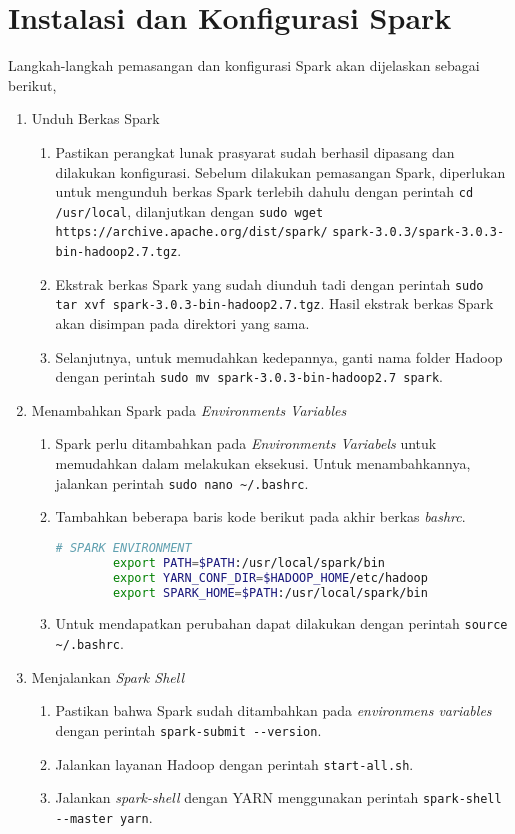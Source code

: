 \chapter{Instalasi dan Konfigurasi Spark}
\label{appendix:D}

Langkah-langkah pemasangan dan konfigurasi Spark akan dijelaskan sebagai berikut,

\begin{enumerate}
  \item Unduh Berkas Spark
  \begin{enumerate}
    \item Pastikan perangkat lunak prasyarat sudah berhasil dipasang dan dilakukan konfigurasi. Sebelum dilakukan pemasangan Spark, diperlukan untuk mengunduh berkas Spark terlebih dahulu dengan perintah \verb|cd /usr/local|, dilanjutkan dengan \verb|sudo wget https://archive.apache.org/dist/spark/|
    \newline \verb|spark-3.0.3/spark-3.0.3-bin-hadoop2.7.tgz|.
    \item Ekstrak berkas Spark yang sudah diunduh tadi dengan perintah \verb|sudo tar xvf spark-3.0.3-bin-hadoop2.7.tgz|. Hasil ekstrak berkas Spark akan disimpan pada direktori yang sama.
    \item Selanjutnya, untuk memudahkan kedepannya, ganti nama folder Hadoop dengan perintah \verb|sudo mv spark-3.0.3-bin-hadoop2.7 spark|.
  \end{enumerate}
  \item Menambahkan Spark pada \textit{Environments Variables}
  \begin{enumerate}
    \item Spark perlu ditambahkan pada \textit{Environments Variabels} untuk memudahkan dalam melakukan eksekusi. Untuk menambahkannya, jalankan perintah \verb|sudo nano ~/.bashrc|.
    \item Tambahkan beberapa baris kode berikut pada akhir berkas \textit{bashrc}.
      \begin{lstlisting}[language=bash]
		# SPARK ENVIRONMENT
		export PATH=$PATH:/usr/local/spark/bin
		export YARN_CONF_DIR=$HADOOP_HOME/etc/hadoop
		export SPARK_HOME=$PATH:/usr/local/spark/bin
      \end{lstlisting}
    \item Untuk mendapatkan perubahan dapat dilakukan dengan perintah \verb|source ~/.bashrc|.
  \end{enumerate}
  \item Menjalankan \textit{Spark Shell}
  \begin{enumerate}
    \item Pastikan bahwa Spark sudah ditambahkan pada \textit{environmens variables} dengan perintah \verb|spark-submit --version|.
    \item Jalankan layanan Hadoop dengan perintah \verb|start-all.sh|.
    \item Jalankan \textit{spark-shell} dengan YARN menggunakan perintah \verb|spark-shell --master yarn|.
  \end{enumerate}
\end{enumerate}